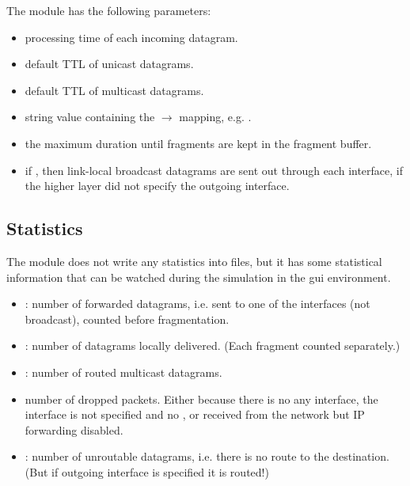 The  module has the following parameters:
\begin{itemize}
  \item {} processing time of each incoming datagram.
  \item {} default TTL of unicast datagrams.
  \item {} default TTL of multicast datagrams.
  \item {} string value containing the 
        $\rightarrow$  mapping, e.g. .
  \item {} the maximum duration until fragments are kept
          in the fragment buffer.
  \item {} if , then link-local broadcast
          datagrams are sent out through each interface, if the higher
          layer did not specify the outgoing interface.
\end{itemize}


\subsection{Statistics}

The  module does not write any statistics into files,
but it has some statistical information that can be watched during
the simulation in the gui environment.
\begin{itemize}
  \item {}: number of forwarded datagrams, i.e. sent to one of the
        interfaces (not broadcast), counted before fragmentation.
  \item {}: number of datagrams locally delivered.
        (Each fragment counted separately.)
  \item {}: number of routed multicast datagrams.
  \item {} number of dropped packets.
        Either because there is no any interface, the interface is not specified and
        no , or received from the network but IP forwarding disabled.
  \item {}: number of unroutable datagrams, i.e. there is no
        route to the destination. (But if outgoing interface is specified it is routed!)
\end{itemize}


